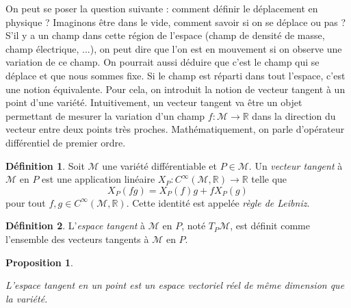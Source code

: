 \documentclass[a4paper,11pt]{report}
\theoremstyle{definition}
\theoremstyle{plain}
\newtheorem{prop}[thm]{Proposition}
\theoremstyle{definition}
\newtheorem{defn}{Définition}[chapter]
\theoremstyle{remark}
\newcommand{\M}{\mathscr{M}}
\begin{document}
                On peut se poser la question suivante : comment définir le déplacement en physique ? Imaginons être dans le vide, comment savoir si on se déplace ou pas ? S'il y a un champ dans cette région de l'espace (champ de densité de masse, champ électrique, ...), on peut dire que l'on est en mouvement si on observe une variation de ce champ. On pourrait aussi déduire que c'est le champ qui se déplace et que nous sommes fixe.  Si le champ est réparti dans tout l'espace, c'est une notion équivalente. Pour cela, on introduit la notion de vecteur tangent à un point d'une variété. Intuitivement, un vecteur tangent va être un objet permettant de mesurer la variation d'un champ $f:\M\to\mathbb{R}$ dans la direction du vecteur entre deux points très proches. Mathématiquement, on parle d'opérateur différentiel de premier ordre.
                
                \begin{defn}
                    Soit $\M$ une variété différentiable et $P\in\M$. Un \textit{vecteur tangent} à $\M$ en $P$ est une application linéaire $X_P:C^\infty(\M,\mathbb{R})\to\mathbb{R}$ telle que
                    \begin{equation}
                        X_P(fg) = X_P(f)g+fX_P(g)
                    \end{equation}
                    pour tout $f,g\in C^\infty(\M,\mathbb{R})$. Cette identité est appelée \textit{règle de Leibniz}.
                \end{defn}
                
                \begin{defn}
                    L'\textit{espace tangent} à $\M$ en $P$, noté $T_P\M$, est définit comme l'ensemble des vecteurs tangents à $\M$ en $P$.
                \end{defn}
                
                \begin{prop}
                \begin{leftbar}
                    L'espace tangent en un point est un espace vectoriel réel de même dimension que la variété.
                \end{leftbar}
                \end{prop}
                
\end{document}
